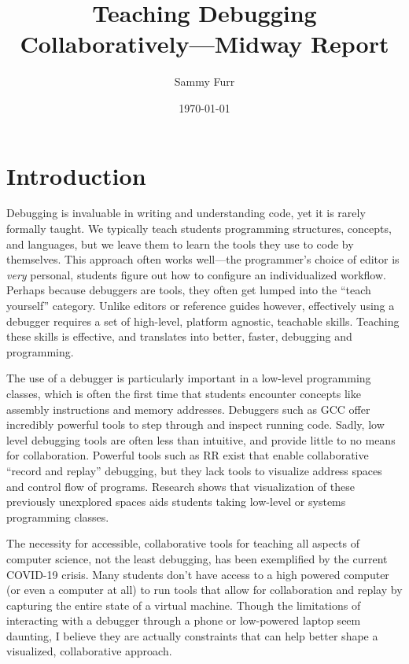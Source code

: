 \documentclass[12pt, twocolumn]{article}
\author{Sammy Furr}
\title{Teaching Debugging Collaboratively---Midway Report}
\date{\today}
\begin{document}
\begin{titlepage}
\maketitle
\end{titlepage}

\section{Introduction}

Debugging is invaluable in writing and understanding code, yet it is
rarely formally taught.  We typically teach students programming
structures, concepts, and languages, but we leave them to learn the
tools they use to code by themselves.  This approach often works
well---the programmer's choice of editor is \textit{very} personal,
students figure out how to configure an individualized workflow.
Perhaps because debuggers are tools, they often get lumped into the
``teach yourself'' category.  Unlike editors or reference guides
however, effectively using a debugger requires a set of high-level,
platform agnostic, teachable skills.  Teaching these skills is
effective, and translates into better, faster, debugging and
programming.\cite{10.1145/3286960.3286970}\cite{10.1145/3361721.3361724}\par

The use of a debugger is particularly important in a low-level
programming classes, which is often the first time that students
encounter concepts like assembly instructions and memory addresses.
Debuggers such as GCC offer incredibly powerful tools to step through
and inspect running code.  Sadly, low level debugging tools are often
less than intuitive, and provide little to no means for collaboration.
Powerful tools such as RR exist that enable collaborative ``record and
replay'' debugging\cite{DBLP:journals/corr/OCallahanJFHNP17}, but they
lack tools to visualize address spaces and control flow of programs.
Research shows that visualization of these previously unexplored
spaces aids students taking low-level or systems programming
classes\cite{10.1145/3328778.3366894}.\par

The necessity for accessible, collaborative tools for teaching all
aspects of computer science, not the least debugging, has been
exemplified by the current COVID-19 crisis.  Many students don't have
access to a high powered computer (or even a computer at all) to run
tools that allow for collaboration and replay by capturing the entire
state of a virtual machine\cite{10.1145/2843859.2843867}.  Though the
limitations of interacting with a debugger through a phone or
low-powered laptop seem daunting, I believe they are actually
constraints that can help better shape a visualized, collaborative
approach.\par
\end{document}
